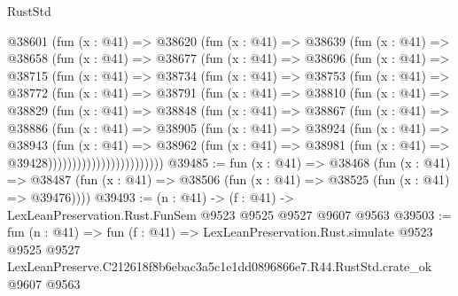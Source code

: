 \begin{lexlean}{RustStd}
\begin{coremodule}
        @38601
          (fun (x : @41) =>
          @38620
            (fun (x : @41) =>
            @38639
              (fun (x : @41) =>
              @38658
                (fun (x : @41) =>
                @38677
                  (fun (x : @41) =>
                  @38696
                    (fun (x : @41) =>
                    @38715
                      (fun (x : @41) =>
                      @38734
                        (fun (x : @41) =>
                        @38753
                          (fun (x : @41) =>
                          @38772
                            (fun (x : @41) =>
                            @38791
                              (fun (x : @41) =>
                              @38810
                                (fun (x : @41) =>
                                @38829
                                  (fun (x : @41) =>
                                  @38848
                                    (fun (x : @41) =>
                                    @38867
                                      (fun (x : @41) =>
                                      @38886
                                        (fun (x : @41) =>
                                        @38905
                                          (fun (x : @41) =>
                                          @38924
                                            (fun (x : @41) =>
                                            @38943
                                              (fun (x : @41) =>
                                              @38962
                                                (fun (x : @41) =>
                                                @38981
                                                  (fun (x : @41) => @39428))))))))))))))))))))))))
@39485 := fun (x : @41) =>
  @38468
    (fun (x : @41) =>
    @38487 (fun (x : @41) => @38506 (fun (x : @41) => @38525 (fun (x : @41) => @39476))))
@39493 := (n : @41) -> (f : @41) -> LexLeanPreservation.Rust.FunSem @9523 @9525 @9527 @9607 @9563
@39503 := fun (n : @41) =>
  fun (f : @41) =>
  LexLeanPreservation.Rust.simulate
    @9523
    @9525
    @9527
    LexLeanPreserve.C212618f8b6ebac3a5c1e1dd0896866e7.R44.RustStd.crate_ok
    @9607
    @9563
\end{coremodule}
\end{lexlean}
